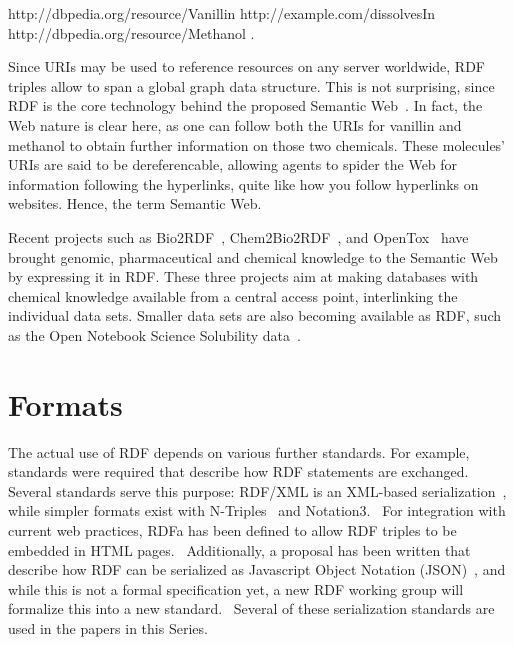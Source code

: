 \documentclass[10pt]{bmc_article}
\newenvironment{bmcformat}{\begin{raggedright}\baselineskip20pt\sloppy\setboolean{publ}{false}}{\end{raggedright}\baselineskip20pt\sloppy}
\begin{document}
\begin{bmcformat}
\vspace{0.3cm}
\begin{small}
http://dbpedia.org/resource/Vanillin http://example.com/dissolvesIn http://dbpedia.org/resource/Methanol .
\end{small}
\vspace{0.3cm}

Since URIs may be used to reference resources on any server worldwide,
RDF triples allow to span a global graph data structure. 
This is not surprising, since RDF is the core technology behind the
proposed Semantic Web~\cite{BER2001}. In fact, the Web
nature is clear here, as one can follow both the URIs for vanillin and methanol to
obtain further information on those two chemicals. These molecules' URIs are said to be
dereferencable, allowing agents to spider the Web for information following
the hyperlinks, quite like how you follow hyperlinks on websites. Hence, the term Semantic Web.

Recent projects such as Bio2RDF~\cite{BEL2008}, Chem2Bio2RDF~\cite{CHE2010},
and OpenTox~\cite{Hardy2010} have brought genomic, pharmaceutical and
chemical knowledge to the Semantic Web by expressing it in RDF.
These three projects aim at making databases with chemical knowledge
available from a central access point, interlinking the individual
data sets. Smaller data sets are also becoming available as RDF, such as
the Open Notebook Science Solubility data~\cite{citeulike:5441072}. 

\section{Formats}

The actual use of RDF depends on various further standards. For example, standards were required
that describe how RDF statements are exchanged. Several standards
serve this purpose: RDF/XML is an XML-based serialization~\cite{Beckett2004}, while
simpler formats exist with N-Triples~\cite{Beckett2004b} and Notation3.~\cite{BernersLee2006} For integration with
current web practices, RDFa has been defined to allow RDF triples to be embedded
in HTML pages.~\cite{RDFA2008} Additionally, a proposal has been written that
describe how RDF can be serialized as Javascript Object Notation (JSON)~\cite{Alexander2008}, and
while this is not a formal specification yet,
a new RDF working group will formalize this into a new standard.~\cite{Herman2010} Several
of these serialization standards are used in the papers in this Series.


\end{bmcformat}
\end{document}

